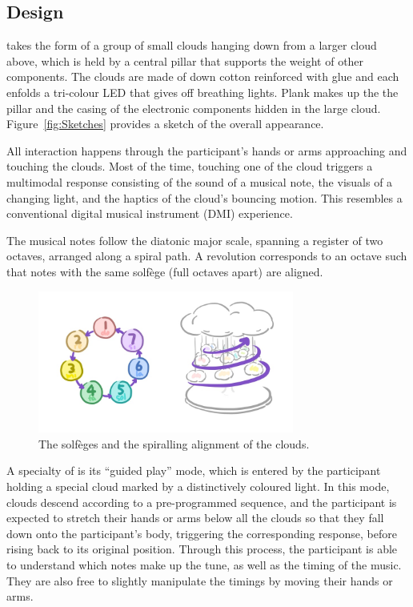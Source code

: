 \documentclass{nimemusic}
\begin{document}
\subsection{Design}
\CuHum{} takes the form of a group of small clouds hanging down from a larger cloud above, which is held by a central pillar that supports the weight of other components. The clouds are made of down cotton reinforced with glue and each enfolds a tri-colour LED that gives off breathing lights. Plank makes up the the pillar and the casing of the electronic components hidden in the large cloud. Figure~\ref{fig:Sketches} provides a sketch of the overall appearance.

All interaction happens through the participant's hands or arms approaching and touching the clouds. Most of the time, touching one of the cloud triggers a multimodal response consisting of the sound of a musical note, the visuals of a changing light, and the haptics of the cloud's bouncing motion. This resembles a conventional digital musical instrument (DMI) experience.

The musical notes follow the diatonic major scale, spanning a register of two octaves, arranged along a spiral path. A revolution corresponds to an octave such that notes with the same solf\`{e}ge (full octaves apart) are aligned.

\begin{figure}[h!]
  \includegraphics[width=0.75\textwidth]{../../images/CuHum_Solfege.jpg}
  \caption{The solf\`{e}ges and the spiralling alignment of the clouds.}
  \label{fig:Solfege}
\end{figure}

A specialty of \CuHum{} is its ``guided play'' mode, which is entered by the participant holding a special cloud marked by a distinctively coloured light. In this mode, clouds descend according to a pre-programmed sequence, and the participant is expected to stretch their hands or arms below all the clouds so that they fall down onto the participant's body, triggering the corresponding response, before rising back to its original position. Through this process, the participant is able to understand which notes make up the tune, as well as the timing of the music. They are also free to slightly manipulate the timings by moving their hands or arms.
\end{document}
